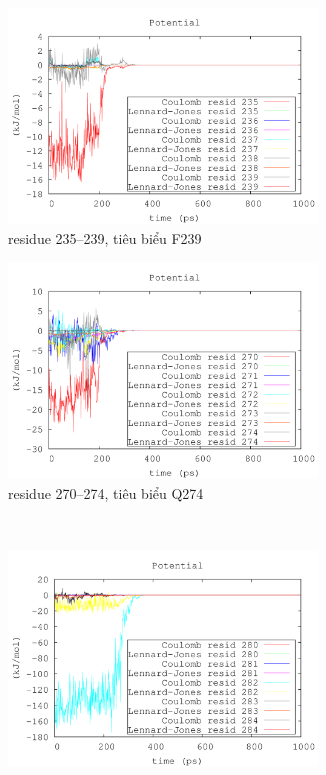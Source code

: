 \documentclass[12pt,a4paper,reqno, oneside]{book}
\begin{document}
\begin{figure}[h!]
\begin{subfigure}{0.5\textwidth}
\includegraphics[width=0.9\textwidth,natwidth=610,natheight=642]{235-239}
\caption{\gls{residue} 235--239, tiêu biểu F239}
\label{fig:239}
\end{subfigure}
\begin{subfigure}{0.5\textwidth}
\includegraphics[width=0.9\textwidth,natwidth=610,natheight=642]{270-274}
\caption{\gls{residue} 270--274, tiêu biểu Q274}
\label{fig:274}
\end{subfigure}\\
\begin{subfigure}{0.5\textwidth}
\includegraphics[width=0.9\textwidth,natwidth=610,natheight=642]{280-284}

\end{subfigure}
\end{figure}
\end{document}
